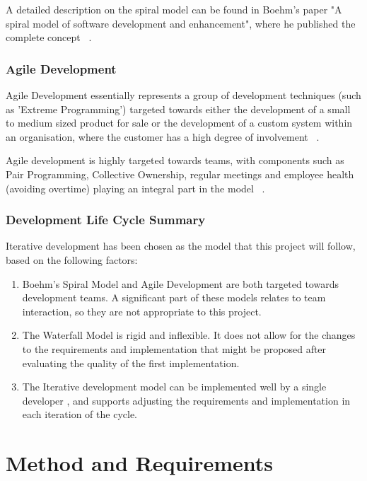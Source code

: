 \documentclass{article}
\begin{document}
A detailed description on the spiral model can be found in Boehm's paper "A spiral model of software development and enhancement", where he published the complete concept ~\cite{spiralModelSoftwareDevelopment}.

\subsubsection{Agile Development}
Agile Development essentially represents a group of development techniques (such as 'Extreme Programming') targeted towards either the development of a small to medium sized product for sale or the development of a custom system within an organisation, where the customer has a high degree of involvement ~\cite{sommervilleSoftwareEngineering}.

Agile development is highly targeted towards teams, with components such as Pair Programming, Collective Ownership, regular meetings and employee health (avoiding overtime) playing an integral part in the model ~\cite{sommervilleSoftwareEngineering}.

\subsubsection{Development Life Cycle Summary}
Iterative development has been chosen as the model that this project will follow, based on the following factors:
\begin{enumerate}
  \item Boehm's Spiral Model and Agile Development are both targeted towards development teams.  A significant part of these models relates to team interaction, so they are not appropriate to this project.
  \item The Waterfall Model is rigid and inflexible.  It does not allow for the changes to the requirements and implementation that might be proposed after evaluating the quality of the first implementation.
  \item The Iterative development model can be implemented well by a single developer , and supports adjusting the requirements and implementation in each iteration of the cycle.
\end{enumerate}


\newpage
\section{Method and Requirements}
\label{sec:method}
\end{document}
